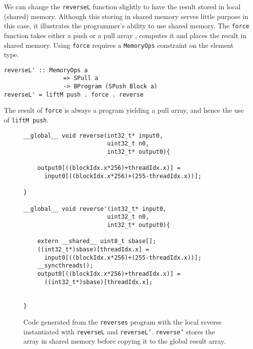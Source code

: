 We can change the {\tt reverseL} function slightly to have the result stored 
in local (shared) memory. Although this storing in shared memory serves little purpose in this case, it illustrates the programmer's ability to use shared memory.
The {\tt force} function takes 
either a push or a pull array , computes it and places the result in shared memory. 
Using {\tt force} requires a {\tt MemoryOps} constraint on the element type.


\begin{small}
\begin{verbatim}
reverseL' :: MemoryOps a
                 => SPull a
                 -> BProgram (SPush Block a)
reverseL' = liftM push . force . reverse
\end{verbatim} 
\end{small} 

The result of {\tt force} is always a program yielding a pull array, and hence the 
use of {\tt liftM push}.



\begin{figure} 
\begin{small} 
\begin{verbatim} 
__global__ void reverse(int32_t* input0,
                        uint32_t n0,
                        int32_t* output0){
  
    output0[((blockIdx.x*256)+threadIdx.x)] = 
      input0[((blockIdx.x*256)+(255-threadIdx.x))];
      
}

__global__ void reverse'(int32_t* input0,
                        uint32_t n0,
                        int32_t* output0){
  
    extern __shared__ uint8_t sbase[];
    ((int32_t*)sbase)[threadIdx.x] = 
      input0[((blockIdx.x*256)+(255-threadIdx.x))];
    __syncthreads();
    output0[((blockIdx.x*256)+threadIdx.x)] = 
      ((int32_t*)sbase)[threadIdx.x];
    
  
}

\end{verbatim}
\end{small}
\caption{Code generated from the {\tt reverses} program with the local reverse instantiated with 
{\tt reverseL} and {\tt reverseL'}. 
 {\tt reverse'} stores the array in shared memory before copying it to the global result array.} 
\label{fig:rev1} 
\end{figure} 

